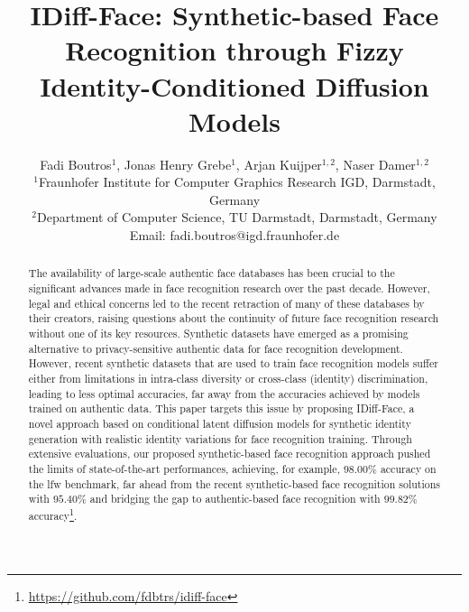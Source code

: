 \documentclass[10pt,twocolumn,letterpaper]{article}
\begin{document}
\title{IDiff-Face: Synthetic-based Face Recognition through Fizzy Identity-Conditioned Diffusion Models}

\author{Fadi Boutros$^{1}$, Jonas Henry Grebe$^{1}$,  Arjan Kuijper$^{1,2}$, Naser Damer$^{1,2}$\\
$^{1}$Fraunhofer Institute for Computer Graphics Research IGD, Darmstadt, Germany\\
$^{2}$Department of Computer Science, TU Darmstadt,
Darmstadt, Germany\\
Email: fadi.boutros@igd.fraunhofer.de
}

\maketitle
\ificcvfinal\thispagestyle{empty}\fi


\begin{abstract}
The availability of large-scale authentic face databases has been crucial to the significant advances made in face recognition research over the past decade. However, legal and ethical concerns led to the recent retraction of many of these databases by their creators, raising questions about the continuity of future face recognition research without one of its key resources. Synthetic datasets have emerged as a promising alternative to privacy-sensitive authentic data for face recognition development. However, recent synthetic datasets that are used to train face recognition models suffer either from limitations in intra-class diversity or cross-class (identity) discrimination, leading to less optimal accuracies, far away from the accuracies achieved by models trained on authentic data. This paper targets this issue by proposing IDiff-Face, a novel approach based on conditional latent diffusion models for synthetic identity generation with realistic identity variations for face recognition training. Through extensive evaluations, our proposed synthetic-based face recognition approach pushed the limits of state-of-the-art performances, achieving, for example, $98.00\%$ accuracy on the \acrfull{lfw} benchmark, far ahead from the recent synthetic-based face recognition solutions with $95.40\%$ and bridging the gap to authentic-based face recognition with $99.82\%$ accuracy\footnote[1]{\url{https://github.com/fdbtrs/idiff-face}}. 
\end{abstract}





\vspace{-5mm}
\end{document}
